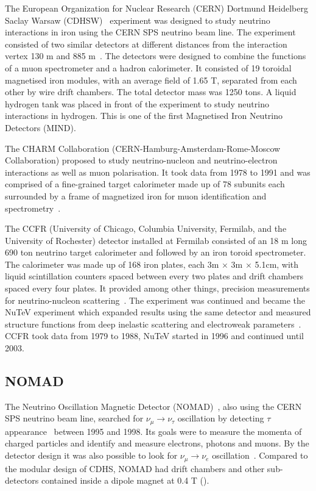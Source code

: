 The European Organization for Nuclear Research (CERN) Dortmund Heidelberg Saclay Warsaw (CDHSW)~\cite{40CDHSW} experiment was designed to study neutrino interactions in iron using the CERN SPS neutrino beam line. The experiment consisted of two similar detectors at different distances from the interaction vertex 130 m and 885 m~\cite{40CDHSW}. The detectors were designed to combine the functions of a muon spectrometer and a hadron calorimeter. It consisted of 19 toroidal magnetised iron modules, with an average field of 1.65 T, separated from each other by wire drift chambers. The total detector mass was 1250 tons. A liquid hydrogen tank was placed in front of the experiment to study neutrino interactions in hydrogen. This is one of the first Magnetised Iron Neutrino Detectors (MIND).

The CHARM Collaboration (CERN-Hamburg-Amsterdam-Rome-Moscow Collaboration) proposed to study neutrino-nucleon and neutrino-electron interactions as well as muon polarisation. It took data from 1978 to 1991 and  was comprised of a fine-grained target calorimeter made up of 78 subunits each surrounded by a frame of magnetized iron for muon identification and spectrometry~\cite{68CHARM}.

The CCFR (University of Chicago, Columbia University, Fermilab, and the University of Rochester) detector installed at Fermilab consisted of an 18 m long 690 ton neutrino target calorimeter and followed by an iron toroid spectrometer. The calorimeter was made up of 168 iron plates, each 3m $\times$ 3m $\times$ 5.1cm, with liquid scintillation counters spaced between every two plates and drift chambers spaced every four plates. It provided among other things, precision measurements for neutrino-nucleon scattering~\cite{67CCFR}. The experiment was continued and became the NuTeV experiment which expanded results using the same detector and measured structure functions from deep inelastic scattering and electroweak parameters~\cite{99Yang, 100Zeller}. CCFR took data from 1979 to 1988, NuTeV started in 1996 and continued until 2003.

\subsection{NOMAD}
The Neutrino Oscillation Magnetic Detector (NOMAD)~\cite{NOMADexp}, also using the CERN SPS neutrino beam line, searched for $\nu_\mu \rightarrow \nu_\tau$ oscillation by detecting $\tau$ appearance~\cite{101Astierj} between 1995 and 1998. Its goals were to measure the momenta of charged particles and identify and measure electrons, photons and muons. By the detector design it was also possible to look for $\nu_\mu \rightarrow \nu_e$ oscillation~\cite{102Astier}. Compared to the modular design of CDHS, NOMAD had drift chambers and other sub-detectors contained inside a dipole magnet at 0.4 T ().


